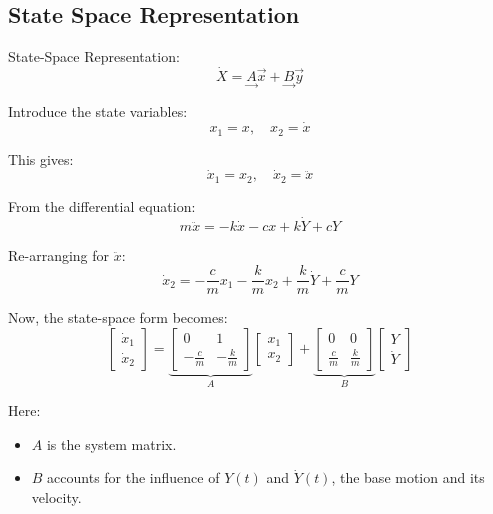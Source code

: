 \documentclass[12pt,a4paper]{article}
\begin{document}
\subsection{State Space Representation}
State-Space Representation:
\[
\dot{X} = \underset{\rightarrow}{A}\vec{x} + \underset{\rightarrow}{B}\vec{y}
\]

Introduce the state variables:
\[
x_1 = x, \quad x_2 = \dot{x}
\]

This gives:
\[
\dot{x}_1 = x_2, \quad \dot{x}_2 = \ddot{x}
\]

From the differential equation:
\[
m\ddot{x} = -k\dot{x} - cx + k\dot{Y} + cY
\]

Re-arranging for \( \ddot{x} \):
\[
\dot{x}_2 = -\frac{c}{m}x_1 - \frac{k}{m}x_2 + \frac{k}{m}\dot{Y} + \frac{c}{m}Y
\]

Now, the state-space form becomes:
\[
\begin{bmatrix}
\dot{x}_1 \\
\dot{x}_2
\end{bmatrix}
=
\underbrace{
\begin{bmatrix}
0 & 1 \\
-\frac{c}{m} & -\frac{k}{m}
\end{bmatrix}}_{A}
\begin{bmatrix}
x_1 \\
x_2
\end{bmatrix}
+
\underbrace{
\begin{bmatrix}
0 & 0 \\
\frac{c}{m} & \frac{k}{m}
\end{bmatrix}}_{B}
\begin{bmatrix}
Y \\
\dot{Y}
\end{bmatrix}
\]

Here:
\begin{itemize}
    \item \( A \) is the system matrix.
    \item \( B \) accounts for the influence of \( Y(t) \) and \( \dot{Y}(t) \), the base motion and its velocity.
\end{itemize}
   
\end{document}
